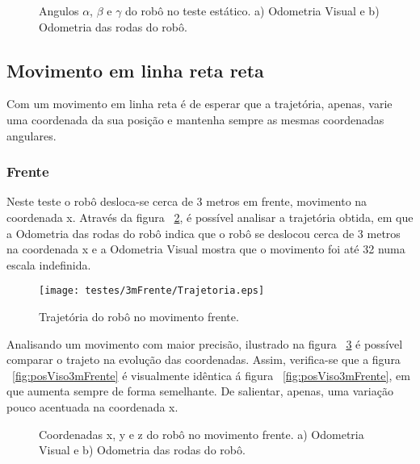 \begin{figure}[!htbp]
	\centering
	\qquad
	\caption{Angulos $\alpha$, $\beta$ e $\gamma$ do robô no teste estático. a) Odometria Visual e b) Odometria das rodas do robô.}
	\label{fig:angEst}
\end{figure}


\FloatBarrier
\subsection{Movimento em linha reta reta}\label{subsubsection:Linha}

Com um movimento em linha reta é de esperar que a trajetória, apenas, varie uma coordenada da sua posição e mantenha sempre as mesmas coordenadas angulares.

\FloatBarrier
\subsubsection{Frente}\label{subsubsection:EmFrente}

Neste teste o robô desloca-se cerca de 3 metros em frente, movimento na coordenada x. 
Através da  figura ~\ref{fig:trajRobo3mFrente}, é possível analisar a trajetória obtida, em que  a Odometria das rodas do robô indica que o robô se deslocou cerca de 3 metros na coordenada x e a Odometria Visual mostra que o movimento foi até 32 numa escala indefinida. 

\begin{figure}[h!]
	\begin{center}
		\leavevmode		
		\texttt{[image: testes/3mFrente/Trajetoria.eps]}
		\caption{Trajetória do robô no movimento frente.}
		\label{fig:trajRobo3mFrente}
	\end{center}
\end{figure}

Analisando um movimento com maior precisão, ilustrado na figura ~\ref{fig:pos3mFrente} é possível comparar o trajeto na evolução das coordenadas. Assim, verifica-se que a figura  ~\ref{fig:posViso3mFrente} é visualmente idêntica á figura ~\ref{fig:posViso3mFrente}, em que aumenta sempre de forma semelhante. De salientar, apenas, uma variação pouco acentuada na coordenada x.


\begin{figure}[h!]
	\centering
	\qquad
	\caption{Coordenadas x, y e z do robô no movimento frente. a) Odometria Visual e b) Odometria das rodas do robô.}
	\label{fig:pos3mFrente}
\end{figure}


